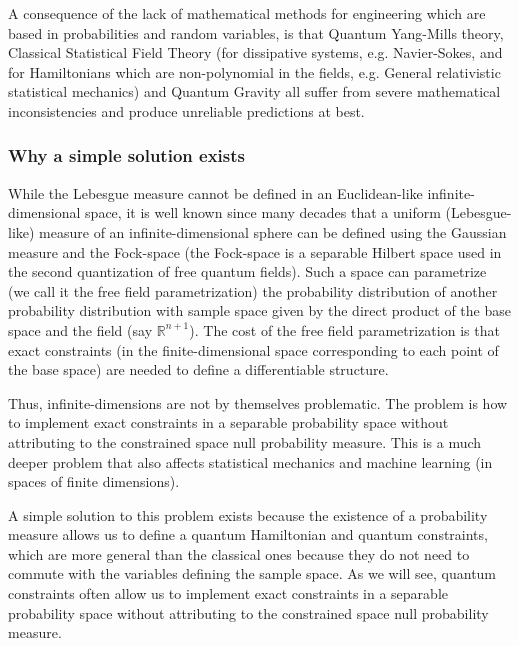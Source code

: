 \documentclass[11pt]{book}
\begin{document}
A consequence of the lack of mathematical methods for engineering which
are based in probabilities and random variables, is that Quantum
Yang-Mills theory, Classical Statistical Field Theory (for dissipative
systems, e.g. Navier-Sokes, and for Hamiltonians which are
non-polynomial in the fields, e.g. General relativistic statistical
mechanics) and Quantum Gravity all suffer from severe mathematical
inconsistencies and produce unreliable predictions at best.

\hypertarget{why-a-simple-solution-exists}{%
\subsubsection{Why a simple solution
exists}\label{why-a-simple-solution-exists}}

While the Lebesgue measure cannot be defined in an Euclidean-like
infinite-dimensional
space\cite{Baker1991ux201cLebesgue}\cite{Baker2004ux201cLebesgue}, it
is well known since many decades that a uniform (Lebesgue-like) measure
of an infinite-dimensional sphere can be defined using the Gaussian
measure and the Fock-space (the Fock-space is a separable Hilbert space
used in the second quantization of free quantum
fields)\cite{Peterson2019GaussianLA}.
Such a space can parametrize (we call it the free field parametrization)
the probability distribution of another probability distribution with
sample space given by the direct product of the base space and the field
(say \(\mathbb{R}^{n+1}\)). The cost of the free field parametrization
is that exact constraints (in the finite-dimensional space corresponding
to each point of the base space) are needed to define a differentiable
structure.

Thus, infinite-dimensions are not by themselves problematic. The problem
is how to implement exact constraints in a separable probability space
without attributing to the constrained space null probability measure.
This is a much deeper problem that also affects statistical
mechanics\cite{constraintssm} and machine
learning\cite{constraintsml}
(in spaces of finite dimensions).

A simple solution to this problem exists because the existence of a
probability measure allows us to define a quantum Hamiltonian and
quantum constraints, which are more general than the classical ones
because they do not need to commute with the variables defining the
sample space. As we will see, quantum constraints often allow us to
implement exact constraints in a separable probability space without
attributing to the constrained space null probability measure.
\end{document}
